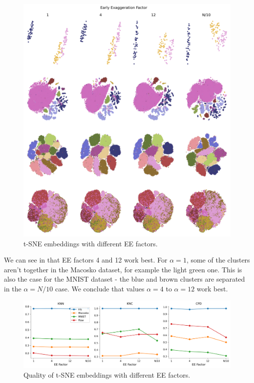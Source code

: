 \begin{figure}[h]
    \centering 
        \includegraphics[width=\linewidth]{../code/figures/alpha_embedding_grid_tab20b.png}
        \caption{t-SNE embeddings with different EE factors.}
    \label{fig:alpha_grid}
\end{figure}

We can see in  that EE factors 4 and 12 work best. For $\alpha=1$, some of the clusters aren't together in the Macosko dataset, for example the light green one. This is also the case for the MNIST dataset - the blue and brown clusters are separated in the $\alpha = N/10$ case. We conclude that values $\alpha=4$ to $\alpha=12$ work best. 

\begin{figure}[h]
    \centering 
        \includegraphics[width=\linewidth]{../code/figures/alpha_3_quality_measures.png}
        \caption{Quality of t-SNE embeddings with different EE factors.}
    \label{fig:alpha_quality}
\end{figure}

